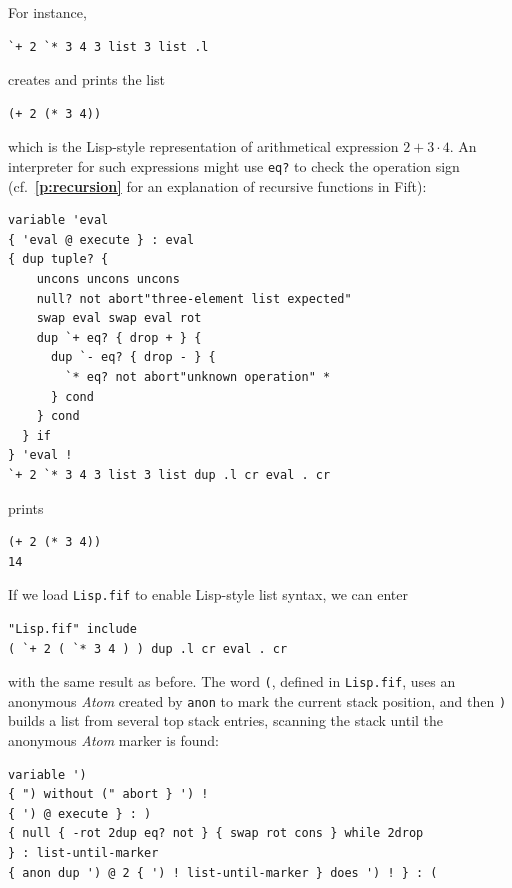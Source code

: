 \documentclass[12pt,oneside]{article}
\def\refpoint#1{{\rm\textbf{\ref{#1}}}}
\let\ptref=\refpoint
\begin{document}
For instance,
\begin{verbatim}
`+ 2 `* 3 4 3 list 3 list .l
\end{verbatim}
creates and prints the list
\begin{verbatim}
(+ 2 (* 3 4))
\end{verbatim}
which is the Lisp-style representation of arithmetical expression $2+3\cdot 4$. An interpreter for such expressions might use {\tt eq?} to check the operation sign (cf.~\ptref{p:recursion} for an explanation of recursive functions in Fift):
\begin{verbatim}
variable 'eval
{ 'eval @ execute } : eval
{ dup tuple? {
    uncons uncons uncons
    null? not abort"three-element list expected"
    swap eval swap eval rot
    dup `+ eq? { drop + } {
      dup `- eq? { drop - } {
        `* eq? not abort"unknown operation" *
      } cond
    } cond
  } if
} 'eval !
`+ 2 `* 3 4 3 list 3 list dup .l cr eval . cr
\end{verbatim}
prints
\begin{verbatim}
(+ 2 (* 3 4))
14
\end{verbatim}
If we load {\tt Lisp.fif} to enable Lisp-style list syntax, we can enter
\begin{verbatim}
"Lisp.fif" include
( `+ 2 ( `* 3 4 ) ) dup .l cr eval . cr
\end{verbatim}
with the same result as before. The word {\tt (}, defined in {\tt Lisp.fif}, uses an anonymous {\em Atom\/} created by {\tt anon} to mark the current stack position, and then {\tt )} builds a list from several top stack entries, scanning the stack until the anonymous {\em Atom\/} marker is found:
\begin{verbatim}
variable ')
{ ") without (" abort } ') !
{ ') @ execute } : )
{ null { -rot 2dup eq? not } { swap rot cons } while 2drop
} : list-until-marker
{ anon dup ') @ 2 { ') ! list-until-marker } does ') ! } : (
\end{verbatim}
\end{document}
